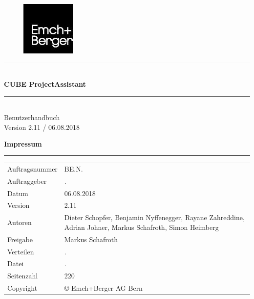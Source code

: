 \documentclass[12pt]{article} %
\newcommand{\HRule}{\rule{\linewidth}{0.5mm}} %
\begin{document}

\begin{titlepage}


\begin{figure}[t] %
\flushright  %
\includegraphics[width=0.2\linewidth]{0_EmBeLogo}
\end{figure}

\vspace*{6cm}

\center %

\HRule \\[0.4cm]
{ \huge \bfseries CUBE ProjectAssistant}\\[0.4cm] %
\HRule \\[1.5cm]

\textsf{\Large Benutzerhandbuch}\\[0.5cm] %
\textsf{\large Version 2.11 / 06.08.2018}\\[0.5cm] %


\pagebreak
\vspace*{15cm}

\flushleft\textbf{ Impressum}
\rule{\textwidth}{1pt}
\begin{flushright}
\begin{flushleft}

\end{flushleft}
\end{flushright}
\begin{tabular}{lp{12cm}}
Auftragsnummer & BE.N.\\
Auftraggeber & .\\
Datum & 06.08.2018\\
Version & 2.11\\
Autoren & Dieter Schopfer, Benjamin Nyffenegger, Rayane Zahreddine, Adrian Johner, Markus Schafroth, Simon Heimberg\\
Freigabe & Markus Schafroth\\
Verteilen & .\\
Datei & .\\
Seitenzahl & 220\\
Copyright & \copyright{ Emch+Berger AG Bern}\\
\end{tabular}


\end{titlepage}
\end{document}
